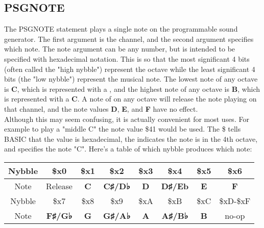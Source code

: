 \subsection{PSGNOTE}

The {\ttfamily PSGNOTE} statement plays a single note on the programmable sound
generator.  The first argument is the channel, and the second argument
specifies which note.  The note argument can be any number, but is intended to
be specified with hexadecimal notation.  This is so that the most significant 4
bits (often called the "high nybble") represent the octave while the least
significant 4 bits (the "low nybble") represent the musical note.  The lowest
note of any octave is {\ttfamily\bfseries C}, which is represented with a
{}, and the highest note of any octave is {\ttfamily\bfseries B},
which is represented with a {\ttfamily\bfseries C}.  A note of {} on
any octave will release the note playing on that channel, and the note values
{\ttfamily\bfseries D}, {\ttfamily\bfseries E}, and {\ttfamily\bfseries F} have
no effect.\\

Although this may seem confusing, it is actually convenient for most uses.
For example to play a "middle C" the note value {\ttfamily \$41} would be used.
The {\ttfamily \$} tells BASIC that the value is hexadecimal, the {}
indicates the note is in the 4th octave, and {} specifies the note
"C".  Here's a table of which nybble produces which note:\\

\begin{tabular}{|c|c|c|c|c|c|c|c|}
	\hline

	Nybble & \$x0 & \$x1 & \$x2 & \$x3 & \$x4 & \$x5 & \$x6 \\ \hline Note &
	Release & {\ttfamily\bfseries C} & {\ttfamily\bfseries C♯/D♭} &
	{\ttfamily\bfseries D} & {\ttfamily\bfseries D♯/Eb} & {\ttfamily\bfseries
	E} & {\ttfamily\bfseries F} \\ \hline

	Nybble & \$x7 & \$x8 & \$x9 & \$xA & \$xB & \$xC & \$xD-\$xF \\ \hline Note
	& {\ttfamily\bfseries F♯/G♭} & {\ttfamily\bfseries G} & {\ttfamily\bfseries
	G♯/A♭} & {\ttfamily\bfseries A} & {\ttfamily\bfseries A♯/B♭} &
	{\ttfamily\bfseries B} & no-op \\ \hline

\end{tabular}\\

